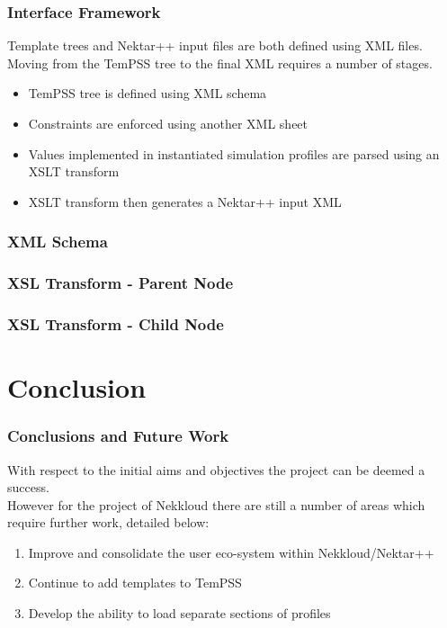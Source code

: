 \documentclass{beamer}
\begin{document}
\begin{frame}\frametitle{Interface Framework}
Template trees and Nektar++ input files are both defined using XML files.\\
\vspace{.25cm}
Moving from the TemPSS tree to the final XML requires a number of stages.
\begin{itemize}
\item TemPSS tree is defined using XML schema
\item Constraints are enforced using another XML sheet
\item Values implemented in instantiated simulation profiles are parsed using an XSLT transform
\item XSLT transform then generates a Nektar++ input XML
\end{itemize} 
\vspace{.25cm}
\centering\textbf{ \href{http://localhost:8080/tempss/profiles/}{}}
\end{frame}

\begin{frame}\frametitle{XML Schema}
 \centering
 \tiny
 
\end{frame}

\begin{frame}\frametitle{XSL Transform - Parent Node}
 \centering
 \tiny
 
\end{frame}


\begin{frame}\frametitle{XSL Transform - Child Node}
 \centering
 \tiny
 
\end{frame}

\section{Conclusion}
\begin{frame}\frametitle{Conclusions and Future Work} 
With respect to the initial aims and objectives the project can be deemed a success.\\
\vspace{.25cm}
However for the project of Nekkloud there are still a number of areas which require further work, detailed below:
 
\begin{enumerate}
\item Improve and consolidate the user eco-system within Nekkloud/Nektar++
\item Continue to add templates to TemPSS
\item Develop the ability to load separate sections of profiles
\end{enumerate}
\end{frame}
\end{document}
